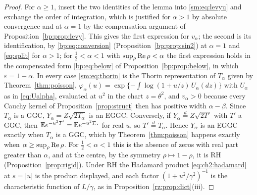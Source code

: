 \begin{proof}
For $\alpha\ge1$, insert the two identities of the lemma into \eqref{sm:eq:levyu} and exchange the order of integration, which is justified for $\alpha>1$ by absolute convergence and at $\alpha=1$ by the compensation argument of Proposition~\ref{bp:prop:levy}. This gives the first expression for $v_\alpha$; the second is its identification, by \eqref{bp:eq:conversion} (Proposition~\ref{bp:prop:sin2}) at $\alpha=1$ and \eqref{eq:split} for $\alpha>1$; for $\frac12<\alpha<1$ with $\sup_\rho\operatorname{Re}\rho<\alpha$ the first expression holds in the compensated form \eqref{bp:eq:below} of Proposition~\ref{bp:prop:below}, in which $\varepsilon=1-\alpha$. In every case \eqref{sm:eq:thorin} is the Thorin representation of $T_\alpha$ given by Theorem~\ref{thm:poisson}, $\varphi_\alpha(u)=\exp\{-\int\log(1+u/z)\,U_\alpha(dz)\}$ with $U_\alpha$ as in \eqref{eq:Ualpha}, evaluated at $u^2$ in the chart $z=\theta^2$, and $v_\alpha>0$ because every Cauchy kernel of Proposition~\ref{prop:struct} then has positive width $\alpha-\beta$. Since $T_\alpha$ is a GGC, $Y_\alpha=Z\sqrt{2T_\alpha}$ is an EGGC. Conversely, if $Y_\alpha\stackrel d=Z\sqrt{2T'}$ with $T'$ a GGC, then $\mathbb{E} e^{-u^2T'}=\mathbb{E} e^{-u^2T_\alpha}$ for real $u$, so $T'\stackrel d=T_\alpha$. Hence $Y_\alpha$ is an EGGC exactly when $T_\alpha$ is a GGC, which by Theorem~\ref{thm:poisson} happens exactly when $\alpha\ge\sup_\rho\operatorname{Re}\rho$. For $\frac12<\alpha<1$ this is the absence of zeros with real part greater than $\alpha$, and at the centre, by the symmetry $\rho\mapsto1-\rho$, it is RH (Proposition~\ref{prop:rigid}). Under RH the Hadamard product \eqref{eq:ch2:hadamard} at $s=|u|$ is the product displayed, and each factor $(1+u^2/\gamma^2)^{-1}$ is the characteristic function of $L/\gamma$, as in Proposition~\ref{rz:prop:dict}(iii).
\end{proof}

